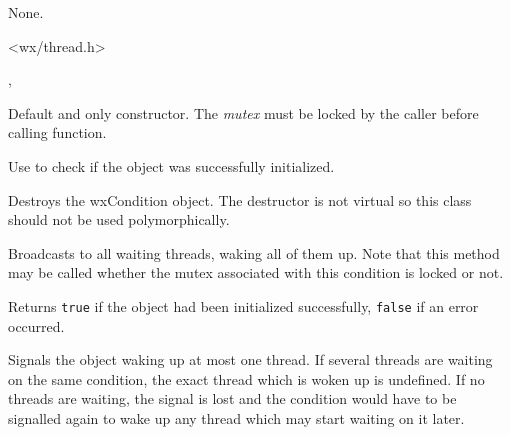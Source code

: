 
None.


<wx/thread.h>


, 


\label{wxconditionctor}


Default and only constructor. The {\it mutex} must be locked by the caller
before calling  function.

Use  to check if the object was successfully
initialized.

\label{wxconditiondtor}


Destroys the wxCondition object. The destructor is not virtual so this class
should not be used polymorphically.

\label{wxconditionbroadcast}


Broadcasts to all waiting threads, waking all of them up. Note that this method
may be called whether the mutex associated with this condition is locked or
not.



\label{wxconditionisok}


Returns {\tt true} if the object had been initialized successfully, {\tt false} 
if an error occurred.

\label{wxconditionsignal}


Signals the object waking up at most one thread. If several threads are waiting
on the same condition, the exact thread which is woken up is undefined. If no
threads are waiting, the signal is lost and the condition would have to be
signalled again to wake up any thread which may start waiting on it later.

